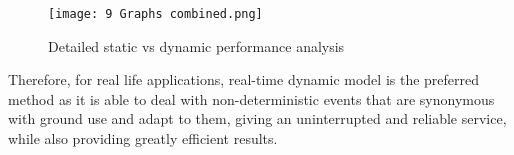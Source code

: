 \documentclass[12pt]{article}
\begin{document}
\begin{figure}[H]
	\centering
	\texttt{[image: 9 Graphs combined.png]}\label{ABCD}
	\caption{Detailed static vs dynamic performance analysis}\label{figcg1}
\end{figure}

Therefore, for real life applications, real-time dynamic model is the preferred method as it is able to deal with non-deterministic events that are synonymous with ground use and adapt to them, giving an uninterrupted and reliable service, while also providing greatly efficient results.


 


\end{document}
